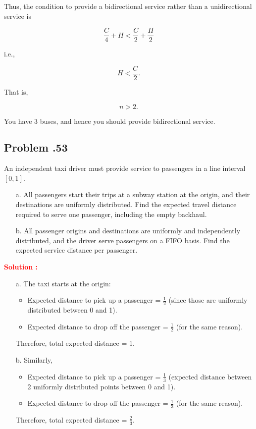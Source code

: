 \documentclass[12pt]{article}
\newcommand{\customsubsection}[1]{
  \subsection*{Problem \thesection.#1}
}
\begin{document}
Thus, the condition to provide a bidirectional service rather than a unidirectional service is

\[
\frac{C}{4} + H < \frac{C}{2} + \frac{H}{2}
\]

i.e.,

\[
H < \frac{C}{2}.
\]

That is,

\[
n > 2.
\]

You have 3 buses, and hence you should provide bidirectional service.

\newpage

\customsubsection{53}
An independent taxi driver must provide service to passengers in a line interval \([0, 1]\). 
\begin{itemize}
    \item [a.] All passengers start their trips at a subway station at the origin, and their destinations are uniformly distributed. Find the expected travel distance required to serve one passenger, including the empty backhaul. 

\item [b.] All passenger origins and destinations are uniformly and independently distributed, and the driver serve passengers on a FIFO basis. Find the expected service distance per passenger. 

\end{itemize}

\textbf{\textcolor{red}{Solution :}} \\

\begin{itemize}
    \item [a.] The taxi starts at the origin:

\begin{itemize}
    \item Expected distance to pick up a passenger = \( \frac{1}{2} \) (since those are uniformly distributed between 0 and 1).
    \item Expected distance to drop off the passenger = \( \frac{1}{2} \) (for the same reason).
\end{itemize}

Therefore, total expected distance = 1.

\item [b.] Similarly,

\begin{itemize}
    \item Expected distance to pick up a passenger = \( \frac{1}{3} \) (expected distance between 2 uniformly distributed points between 0 and 1).
    \item Expected distance to drop off the passenger = \( \frac{1}{3} \) (for the same reason).
\end{itemize}

Therefore, total expected distance = \( \frac{2}{3} \).

\end{itemize}
\newpage
\end{document}

